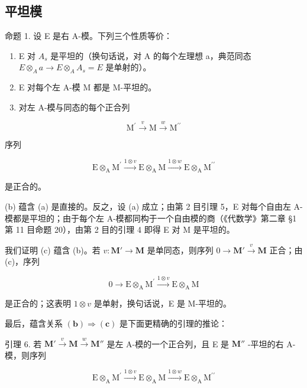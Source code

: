 \subsection{平坦模}

命题 1. 设 E 是右 A-模。下列三个性质等价：

\begin{enumerate}
\def\labelenumi{(\alph{enumi})}
\item
  E 对 \(A_{s}\) 是平坦的（换句话说，对 A 的每个左理想 a，典范同态 \(E \otimes_{A} a \to E \otimes_{A} A_{s} = E\) 是单射的）。
\item
  E 对每个左 A-模 M 都是 M-平坦的。
\item
  对左 A-模与同态的每个正合列
\end{enumerate}

\[
\mathrm{M} ^ {\prime} \xrightarrow {v} \mathrm{M} \xrightarrow {w} \mathrm{M} ^ {\prime \prime}
\]

序列

\[
\mathrm{E} \otimes_ {\mathrm{A}} \mathrm{M} ^ {\prime} \xrightarrow {1 \otimes v} \mathrm{E} \otimes_ {\mathrm{A}} \mathrm{M} \xrightarrow {1 \otimes w} \mathrm{E} \otimes_ {\mathrm{A}} \mathrm{M} ^ {\prime \prime}
\]

是正合的。

(b) 蕴含 (a) 是直接的。反之，设 (a) 成立；由第 2 目引理 5，E 对每个自由左 A-模都是平坦的；由于每个左 A-模都同构于一个自由模的商（《代数学》第二章 §1 第 11 目命题 20），由第 2 目的引理 4 即得 E 对 M 是平坦的。

我们证明 (c) 蕴含 (b)。若 \(v \colon \mathbf{M}' \to \mathbf{M}\) 是单同态，则序列 \(0 \to \mathbf{M}' \xrightarrow{v} \mathbf{M}\) 正合；由 (c)，序列

\[
0 \rightarrow \mathrm{E} \otimes_ {\mathrm{A}} \mathrm{M} ^ {\prime} \xrightarrow {1 \otimes v} \mathrm{E} \otimes_ {\mathrm{A}} \mathrm{M}
\]

是正合的；这表明 \(1 \otimes v\) 是单射，换句话说，E 是 M-平坦的。

最后，蕴含关系 \((\mathbf{b}) \Rightarrow (\mathbf{c})\) 是下面更精确的引理的推论：

引理 6. 若 \(\mathbf{M}' \xrightarrow{v} \mathbf{M} \xrightarrow{w} \mathbf{M}''\) 是左 A-模的一个正合列，且 E 是 \(\mathbf{M}''\) -平坦的右 A-模，则序列

\[
\mathrm{E} \otimes_ {\mathrm{A}} \mathrm{M} ^ {\prime} \xrightarrow {1 \otimes v} \mathrm{E} \otimes_ {\mathrm{A}} \mathrm{M} \xrightarrow {1 \otimes w} \mathrm{E} \otimes_ {\mathrm{A}} \mathrm{M} ^ {\prime \prime}
\]

